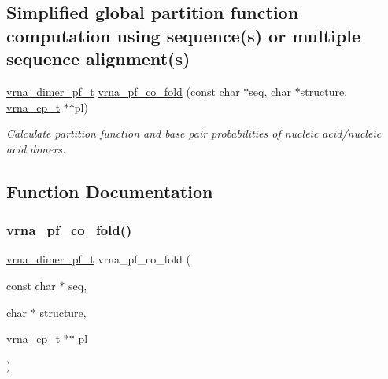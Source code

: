 \subsection*{Simplified global partition function computation using sequence(s) or multiple sequence alignment(s)}
\begin{DoxyCompactItemize}
\item 
\hyperlink{group__pf__cofold_ga444df1587c9a2ca15b8eb25188f629c3}{vrna\+\_\+dimer\+\_\+pf\+\_\+t} \hyperlink{group__part__func__global_gaf2b846f7ac382686f35ff7b9202fdd5c}{vrna\+\_\+pf\+\_\+co\+\_\+fold} (const char $\ast$seq, char $\ast$structure, \hyperlink{group__struct__utils__plist_gab9ac98ab55ded9fb90043b024b915aca}{vrna\+\_\+ep\+\_\+t} $\ast$$\ast$pl)
\begin{DoxyCompactList}\small\item\em Calculate partition function and base pair probabilities of nucleic acid/nucleic acid dimers. \end{DoxyCompactList}\end{DoxyCompactItemize}


\subsection{Function Documentation}
\mbox{\label{group__part__func__global_gaf2b846f7ac382686f35ff7b9202fdd5c}} 
\subsubsection{\texorpdfstring{vrna\+\_\+pf\+\_\+co\+\_\+fold()}{vrna\_pf\_co\_fold()}}
{\footnotesize\ttfamily \hyperlink{group__pf__cofold_ga444df1587c9a2ca15b8eb25188f629c3}{vrna\+\_\+dimer\+\_\+pf\+\_\+t} vrna\+\_\+pf\+\_\+co\+\_\+fold (\begin{DoxyParamCaption}\item[{const char $\ast$}]{seq,  }\item[{char $\ast$}]{structure,  }\item[{\hyperlink{group__struct__utils__plist_gab9ac98ab55ded9fb90043b024b915aca}{vrna\+\_\+ep\+\_\+t} $\ast$$\ast$}]{pl }\end{DoxyParamCaption})}



